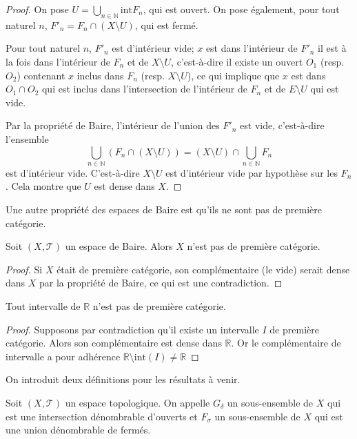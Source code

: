 \begin{proof}
  On pose $U = \bigcup_{n\in\mathbb N} \mathrm{int}F_n$, qui est
  ouvert. On pose également, pour tout naturel $n$,
  $F'_n = F_n\cap (X\setminus U)$, qui est fermé.

  Pour tout naturel $n$, $F'_n$ est d'intérieur vide; $x$ est dans
  l'intérieur de $F'_n$ \ssi{} il est à la fois dans l'intérieur de
  $F_n$ et de $X\setminus U$, c'est-à-dire il existe un ouvert $O_1$
  (resp. $O_2$) contenant $x$ inclus dans $F_n$ (resp. $X\setminus U$),
  ce qui implique que $x$ est dans $O_1\cap O_2$ qui est inclus dans
  l'intersection de l'intérieur de $F_n$ et de $E\setminus U$ qui est vide.

  Par la propriété de Baire, l'intérieur de l'union des $F'_n$ est vide,
  c'est-à-dire l'ensemble
  $$\bigcup_{n\in\mathbb N} \left(F_n \cap (X\setminus U)\right) =
  (X\setminus U)\cap \bigcup_{n\in\mathbb N} F_n$$
  est d'intérieur vide. C'est-à-dire $X\setminus U$ est d'intérieur vide
  par hypothèse sur les $F_n$. Cela montre que
  $U$ est dense dans $X$.
\end{proof}

Une autre propriété des espaces de Baire est qu'ils ne sont pas de première
catégorie.
\begin{prop}
  Soit $(X, \mathcal T)$ un espace de Baire. Alors $X$ n'est pas de
  première catégorie.
\end{prop}
\begin{proof}
  Si $X$ était de première catégorie, son complémentaire (le vide) serait
  dense dans $X$ par la propriété de Baire, ce qui est une contradiction.
\end{proof}

\begin{prop}
  Tout intervalle de $\mathbb R$ n'est pas de première catégorie.
\end{prop}
\begin{proof}
  Supposons par contradiction qu'il existe un intervalle $I$
  de première catégorie. Alors son complémentaire est dense dans
  $\mathbb R$. Or le complémentaire de intervalle a pour
  adhérence $\mathbb R\setminus \mathrm{int}(I)\neq \mathbb R$
\end{proof}

On introduit deux définitions pour les résultats à venir.
\begin{df}
  Soit $(X, \mathcal{T})$ un espace topologique. On appelle $G_\delta$ un
  sous-ensemble de $X$ qui est une intersection dénombrable d'ouverts et
  $F_\sigma$ un sous-ensemble de $X$ qui est une union dénombrable de fermés.
\end{df}


